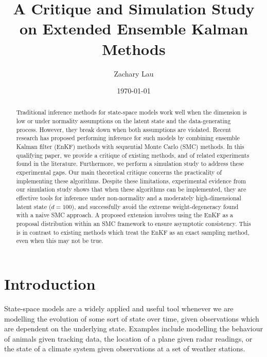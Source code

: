 \documentclass[12pt]{article}
\author{Zachary Lau}
\title{A Critique and Simulation Study on Extended Ensemble Kalman Methods}
\date{\today}
\begin{document}
\maketitle

\begin{abstract}
Traditional inference methods for state-space models work well when the dimension is
low or under normality assumptions on the latent state and the data-generating
process. However, they break down when both assumptions are violated. Recent
research has proposed performing inference for such models by combining ensemble
Kalman filter (EnKF) methods with sequential Monte Carlo (SMC) methods. In this
qualifying paper, we provide a critique of existing methods, and of related
experiments found in the literature. Furthermore, we perform a simulation study
to address these experimental gaps. Our main theoretical critique concerns the
practicality of implementing these algorithms. Despite these limitations,
experimental evidence from our simulation study shows that when these algorithms
can be implemented, they are effective tools for inference under non-normality
and a moderately high-dimensional latent state ($d=100$), and successfully avoid
the extreme weight-degeneracy found with a naive SMC approach. A proposed
extension involves using the EnKF as a proposal distribution within an SMC
framework to ensure asymptotic consistency. This is in contrast to existing
methods which treat the EnKF as an exact sampling method, even when this may not
be true.
\end{abstract}

\section{Introduction}
State-space models are a widely applied and useful tool whenever we are
modelling the evolution of some sort of state over time, given observations
which are dependent on the underlying state. Examples include modelling
the behaviour of animals given tracking data, the location
of a plane given radar readings, or the state of a climate system given
observations at a set of weather stations.
\end{document}
